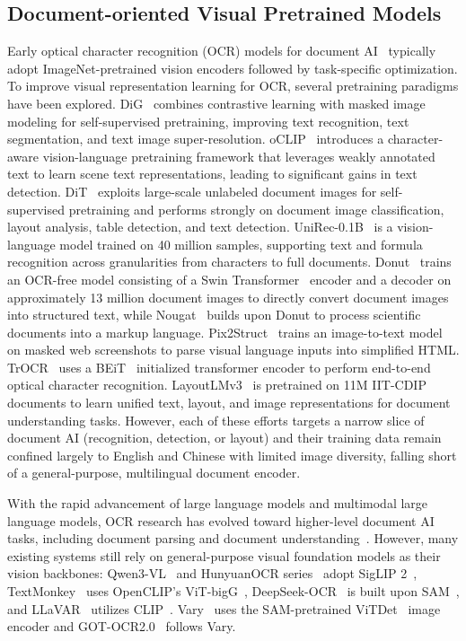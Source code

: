 \documentclass{article}
\begin{document}
\subsection{Document-oriented Visual Pretrained Models}
    Early optical character recognition (OCR) models for document AI~\cite{dbnet} typically adopt ImageNet-pretrained vision encoders followed by task-specific optimization. To improve visual representation learning for OCR, several pretraining paradigms have been explored. DiG~\cite{dig} combines contrastive learning with masked image modeling for self-supervised pretraining, improving text recognition, text segmentation, and text image super-resolution. oCLIP~\cite{oclip} introduces a character-aware vision-language pretraining framework that leverages weakly annotated text to learn scene text representations, leading to significant gains in text detection. DiT~\cite{dit} exploits large-scale unlabeled document images for self-supervised pretraining and performs strongly on document image classification, layout analysis, table detection, and text detection. UniRec-0.1B~\cite{unirec} is a vision-language model trained on 40 million samples, supporting text and formula recognition across granularities from characters to full documents. Donut~\cite{donut} trains an OCR-free model consisting of a Swin Transformer~\cite{swin} encoder and a decoder on approximately 13 million document images to directly convert document images into structured text, while Nougat~\cite{nougat} builds upon Donut to process scientific documents into a markup language. Pix2Struct~\cite{pix2struct} trains an image-to-text model on masked web screenshots to parse visual language inputs into simplified HTML. TrOCR~\cite{trocr} uses a BEiT~\cite{beit} initialized transformer encoder to perform end-to-end optical character recognition.
    LayoutLMv3~\cite{layoutlmv3} is pretrained on 11M IIT-CDIP~\cite{iitcdip} documents to learn unified text, layout, and image representations for document understanding tasks.
    However, each of these efforts targets a narrow slice of document AI (recognition, detection, or layout) and their training data remain confined largely to English and Chinese with limited image diversity, falling short of a general-purpose, multilingual document encoder.



    With the rapid advancement of large language models and multimodal large language models, OCR research has evolved toward higher-level document AI tasks, including document parsing and document understanding~\cite{monkey,docowl1.5}. However, many existing systems still rely on general-purpose visual foundation models as their vision backbones: Qwen3-VL~\cite{qwen3vl} and HunyuanOCR series~\cite{hunyuanocr, hunyuanocr15} adopt SigLIP 2~\cite{siglip2}, TextMonkey~\cite{textmonkey} uses OpenCLIP's ViT-bigG~\cite{openclip}, DeepSeek-OCR~\cite{deepseekocr} is built upon SAM~\cite{sam}, and LLaVAR~\cite{llavar} utilizes CLIP~\cite{clip}.
    Vary~\cite{vary} uses the SAM-pretrained ViTDet~\cite{vitdet} image encoder and GOT-OCR2.0~\cite{gotocr2} follows Vary.
    
\end{document}
